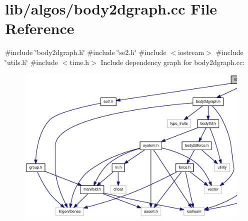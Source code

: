 \section{lib/algos/body2dgraph.cc \-File \-Reference}
\label{body2dgraph_8cc}
{\ttfamily \#include \char`\"{}body2dgraph.\-h\char`\"{}}\*
{\ttfamily \#include \char`\"{}se2.\-h\char`\"{}}\*
{\ttfamily \#include $<$iostream$>$}\*
{\ttfamily \#include \char`\"{}utils.\-h\char`\"{}}\*
{\ttfamily \#include $<$time.\-h$>$}\*
\-Include dependency graph for body2dgraph.\-cc\-:\nopagebreak
\begin{figure}[H]
\begin{center}
\leavevmode
\includegraphics[width=350pt]{body2dgraph_8cc__incl}
\end{center}
\end{figure}
